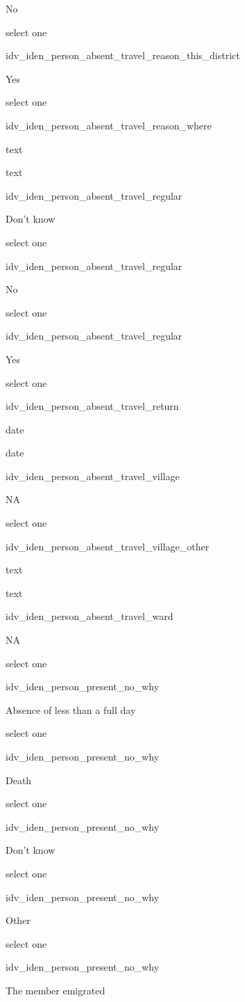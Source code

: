 \documentclass[]{article}
\begin{document}
No

select one

idv\_iden\_person\_absent\_travel\_reason\_this\_district

Yes

select one

idv\_iden\_person\_absent\_travel\_reason\_where

text

text

idv\_iden\_person\_absent\_travel\_regular

Don't know

select one

idv\_iden\_person\_absent\_travel\_regular

No

select one

idv\_iden\_person\_absent\_travel\_regular

Yes

select one

idv\_iden\_person\_absent\_travel\_return

date

date

idv\_iden\_person\_absent\_travel\_village

NA

select one

idv\_iden\_person\_absent\_travel\_village\_other

text

text

idv\_iden\_person\_absent\_travel\_ward

NA

select one

idv\_iden\_person\_present\_no\_why

Absence of less than a full day

select one

idv\_iden\_person\_present\_no\_why

Death

select one

idv\_iden\_person\_present\_no\_why

Don't know

select one

idv\_iden\_person\_present\_no\_why

Other

select one

idv\_iden\_person\_present\_no\_why

The member emigrated
\end{document}
